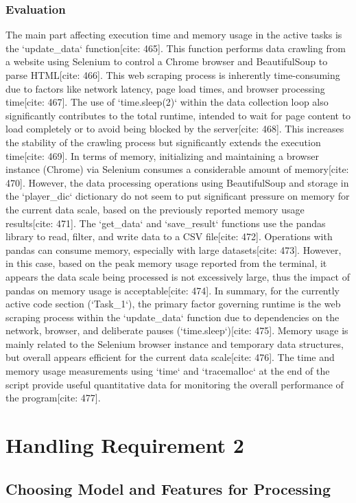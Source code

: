 \documentclass[12pt]{report}
\begin{document}
{{{\subsubsection{Evaluation}
The main part affecting execution time and memory usage in the active tasks is the `update\_data` function[cite: 465]. This function performs data crawling from a website using Selenium to control a Chrome browser and BeautifulSoup to parse HTML[cite: 466]. This web scraping process is inherently time-consuming due to factors like network latency, page load times, and browser processing time[cite: 467]. The use of `time.sleep(2)` within the data collection loop also significantly contributes to the total runtime, intended to wait for page content to load completely or to avoid being blocked by the server[cite: 468]. This increases the stability of the crawling process but significantly extends the execution time[cite: 469]. In terms of memory, initializing and maintaining a browser instance (Chrome) via Selenium consumes a considerable amount of memory[cite: 470]. However, the data processing operations using BeautifulSoup and storage in the `player\_dic` dictionary do not seem to put significant pressure on memory for the current data scale, based on the previously reported memory usage results[cite: 471]. The `get\_data` and `save\_result` functions use the pandas library to read, filter, and write data to a CSV file[cite: 472]. Operations with pandas can consume memory, especially with large datasets[cite: 473]. However, in this case, based on the peak memory usage reported from the terminal, it appears the data scale being processed is not excessively large, thus the impact of pandas on memory usage is acceptable[cite: 474]. In summary, for the currently active code section (`Task\_1`), the primary factor governing runtime is the web scraping process within the `update\_data` function due to dependencies on the network, browser, and deliberate pauses (`time.sleep`)[cite: 475]. Memory usage is mainly related to the Selenium browser instance and temporary data structures, but overall appears efficient for the current data scale[cite: 476]. The time and memory usage measurements using `time` and `tracemalloc` at the end of the script provide useful quantitative data for monitoring the overall performance of the program[cite: 477].
\section{Handling Requirement 2}
\subsection{Choosing Model and Features for Processing}
}}}
\end{document}
